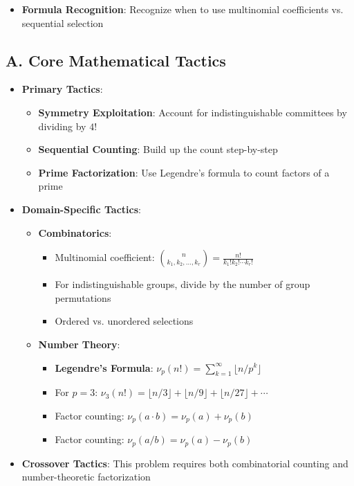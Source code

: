 \documentclass[12pt]{article}
\begin{document}
\begin{strategicbox}
\begin{itemize}[leftmargin=*]
    \item \textbf{Formula Recognition}: Recognize when to use multinomial coefficients vs. sequential selection
\end{itemize}
\end{strategicbox}

\begin{tacticalbox}
\subsection*{A. Core Mathematical Tactics}
\begin{itemize}[leftmargin=*]
    \item \textbf{Primary Tactics}: 
    \begin{itemize}
        \item \textbf{Symmetry Exploitation}: Account for indistinguishable committees by dividing by $4!$
        \item \textbf{Sequential Counting}: Build up the count step-by-step
        \item \textbf{Prime Factorization}: Use Legendre's formula to count factors of a prime
    \end{itemize}
    
    \item \textbf{Domain-Specific Tactics}:
    \begin{itemize}
        \item \textbf{Combinatorics}:
        \begin{itemize}
            \item Multinomial coefficient: $\binom{n}{k_1,k_2,\ldots,k_r} = \frac{n!}{k_1!k_2!\cdots k_r!}$
            \item For indistinguishable groups, divide by the number of group permutations
            \item Ordered vs. unordered selections
        \end{itemize}
        
        \item \textbf{Number Theory}:
        \begin{itemize}
            \item \textbf{Legendre's Formula}: $\nu_p(n!) = \sum_{k=1}^{\infty} \lfloor n/p^k \rfloor$
            \item For $p=3$: $\nu_3(n!) = \lfloor n/3 \rfloor + \lfloor n/9 \rfloor + \lfloor n/27 \rfloor + \cdots$
            \item Factor counting: $\nu_p(a \cdot b) = \nu_p(a) + \nu_p(b)$
            \item Factor counting: $\nu_p(a / b) = \nu_p(a) - \nu_p(b)$
        \end{itemize}
    \end{itemize}
    
    \item \textbf{Crossover Tactics}: This problem requires both combinatorial counting and number-theoretic factorization
\end{itemize}
\end{tacticalbox}
\end{document}
